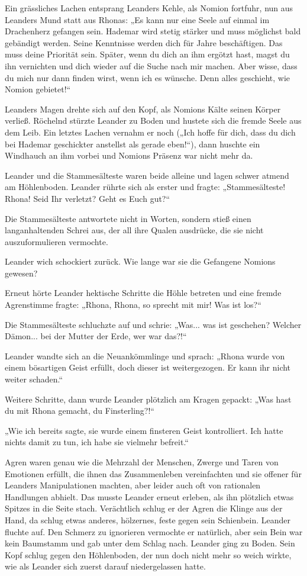 Ein grässliches Lachen entsprang Leanders Kehle, als Nomion fortfuhr, nun aus Leanders Mund statt aus Rhonas: „Es kann nur eine Seele auf einmal im Drachenherz gefangen sein. Hademar wird stetig stärker und muss möglichst bald gebändigt werden. Seine Kenntnisse werden dich für Jahre beschäftigen. Das muss deine Priorität sein. Später, wenn du dich an ihm ergötzt hast, magst du ihn vernichten und dich wieder auf die Suche nach mir machen. Aber wisse, dass du mich nur dann finden wirst, wenn ich es wünsche. Denn alles geschieht, wie Nomion gebietet!“

Leanders Magen drehte sich auf den Kopf, als Nomions Kälte seinen Körper verließ. Röchelnd stürzte Leander zu Boden und hustete sich die fremde Seele aus dem Leib. Ein letztes Lachen vernahm er noch („Ich hoffe für dich, dass du dich bei Hademar geschickter anstellst als gerade eben!“), dann huschte ein Windhauch an ihm vorbei und Nomions Präsenz war nicht mehr da.

Leander und die Stammesälteste waren beide alleine und lagen schwer atmend am Höhlenboden. Leander rührte sich als erster und fragte: „Stammesälteste! Rhona! Seid Ihr verletzt? Geht es Euch gut?“

Die Stammesälteste antwortete nicht in Worten, sondern stieß einen langanhaltenden Schrei aus, der all ihre Qualen ausdrücke, die sie nicht auszuformulieren vermochte.

Leander wich schockiert zurück. Wie lange war sie die Gefangene Nomions gewesen?

Erneut hörte Leander hektische Schritte die Höhle betreten und eine fremde Agrenstimme fragte: „Rhona, Rhona, so sprecht mit mir! Was ist los?“

Die Stammesälteste schluchzte auf und schrie: „Was... was ist geschehen? Welcher Dämon... bei der Mutter der Erde, wer war das?!“

Leander wandte sich an die Neuankömmlinge und sprach: „Rhona wurde von einem bösartigen Geist erfüllt, doch dieser ist weitergezogen. Er kann ihr nicht weiter schaden.“

Weitere Schritte, dann wurde Leander plötzlich am Kragen gepackt: „Was hast du mit Rhona gemacht, du Finsterling?!“

„Wie ich bereits sagte, sie wurde einem finsteren Geist kontrolliert. Ich hatte nichts damit zu tun, ich habe sie vielmehr befreit.“

Agren waren genau wie die Mehrzahl der Menschen, Zwerge und Taren von Emotionen erfüllt, die ihnen das Zusammenleben vereinfachten und sie offener für Leanders Manipulationen machten, aber leider auch oft von rationalen Handlungen abhielt. Das musste Leander erneut erleben, als ihn plötzlich etwas Spitzes in die Seite stach. Verächtlich schlug er der Agren die Klinge aus der Hand, da schlug etwas anderes, hölzernes, feste gegen sein Schienbein. Leander fluchte auf. Den Schmerz zu ignorieren vermochte er natürlich, aber sein Bein war kein Baumstamm und gab unter dem Schlag nach. Leander ging zu Boden. Sein Kopf schlug gegen den Höhlenboden, der nun doch nicht mehr so weich wirkte, wie als Leander sich zuerst darauf niedergelassen hatte.

